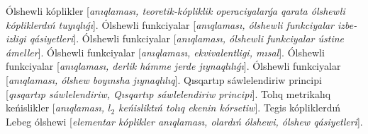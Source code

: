Ólshewli kóplikler [\textit{anıqlaması, teoretik-kópliklik operaciyalarǵa qarata ólshewli kópliklerdıń tuyıqlıǵı}].
Ólshewli funkciyalar [\textit{anıqlaması, ólshewli funkciyalar izbe-izligi qásiyetleri}].
Ólshewli funkciyalar [\textit{anıqlaması, ólshewli funkciyalar ústine ámeller}].
Ólshewli funkciyalar [\textit{anıqlaması, ekvivalentligi, mısal}].
Ólshewli funkciyalar [\textit{anıqlaması, derlik hámme jerde jıynaqlılıǵı}].
Ólshewli funkciyalar [\textit{anıqlaması, ólshew boyınsha jıynaqlılıq}].
Qısqartıp sáwlelendiriw principi [\textit{qısqartıp sáwlelendiriw, Qısqartıp sáwlelendiriw principi}].
Tolıq metrikalıq keńislikler [\textit{anıqlaması, \(l_{2}\) keńisliktıń tolıq ekenin kórsetiw}].
Tegis kópliklerdıń Lebeg ólshewi [\textit{elementar kóplikler anıqlaması, olardıń ólshewi, ólshew qásiyetleri}].